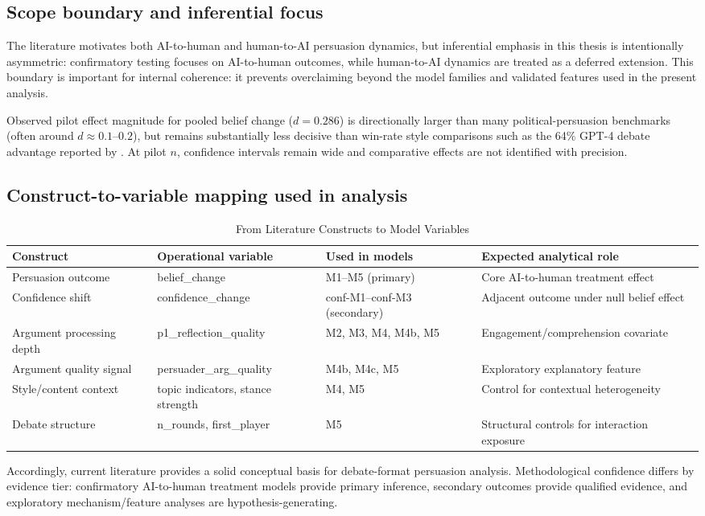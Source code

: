 \subsection*{Scope boundary and inferential focus}

The literature motivates both AI-to-human and human-to-AI persuasion dynamics,
but inferential emphasis in this thesis is intentionally asymmetric: confirmatory
testing focuses on AI-to-human outcomes, while human-to-AI dynamics are treated
as a deferred extension. This boundary is important for internal coherence: it
prevents overclaiming beyond the model families and validated features used in
the present analysis.

Observed pilot effect magnitude for pooled belief change ($d=0.286$) is directionally
larger than many political-persuasion benchmarks (often around $d\approx0.1$--$0.2$),
but remains substantially less decisive than win-rate style comparisons such as the
64\% GPT-4 debate advantage reported by \textcite{salvi2025_chatgpt_debates}.
At pilot $n$, confidence intervals remain wide and comparative effects are not
identified with precision.

\subsection*{Construct-to-variable mapping used in analysis}

\begin{table}[h]
\centering
\caption{From Literature Constructs to Model Variables}
\footnotesize
\setlength{\tabcolsep}{4pt}
\renewcommand{\arraystretch}{1.15}
\begin{tabular}{@{}L{2.6cm}L{3.3cm}L{2.6cm}L{5.8cm}@{}}
\toprule
Construct & Operational variable & Used in models & Expected analytical role \\
\midrule
Persuasion outcome & belief\_change & M1--M5 (primary) & Core AI-to-human treatment effect \\
Confidence shift & confidence\_change & conf-M1--conf-M3 (secondary) & Adjacent outcome under null belief effect \\
Argument processing depth & p1\_reflection\_quality & M2, M3, M4, M4b, M5 & Engagement/comprehension covariate \\
Argument quality signal & persuader\_arg\_quality & M4b, M4c, M5 & Exploratory explanatory feature \\
Style/content context & topic indicators, stance strength & M4, M5 & Control for contextual heterogeneity \\
Debate structure & n\_rounds, first\_player & M5 & Structural controls for interaction exposure \\
\bottomrule
\end{tabular}
\end{table}

Accordingly, current literature provides a solid conceptual basis for debate-format
persuasion analysis. Methodological confidence differs by evidence tier:
confirmatory AI-to-human treatment models provide primary inference,
secondary outcomes provide qualified evidence, and exploratory mechanism/feature
analyses are hypothesis-generating.